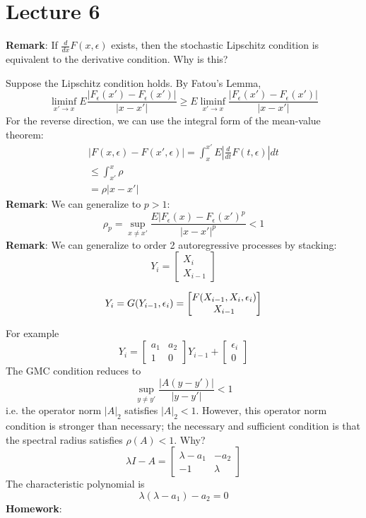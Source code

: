 \section{Lecture 6}

\textbf{Remark}: If \(\frac{d}{dx} F(x, \epsilon)\) exists, then the stochastic Lipschitz condition is equivalent to the derivative condition. Why is this?

Suppose the Lipschitz condition holds. By Fatou's Lemma,
\[\liminf_{x' \to x} E \frac{|F_\epsilon(x') - F_\epsilon(x')|}{|x - x'|} \geq E \liminf_{x' \to x} \frac{|F_\epsilon(x') - F_\epsilon(x')|}{|x - x'|}\]
For the reverse direction, we can use the integral form of the mean-value theorem:
\[\begin{gathered}|F(x, \epsilon) - F(x', \epsilon)| = \int_x^{x'} E \left| \frac{d}{dt} F(t, \epsilon) \right| dt \\
\leq \int_{x'}^x \rho \\
= \rho |x - x'|\end{gathered}\]
\textbf{Remark}: We can generalize to \(p > 1\):
\[\rho_p = \sup_{x \neq x'} \frac{E |F_\epsilon(x) - F_\epsilon(x')^p}{|x - x'|^p} < 1\]
\textbf{Remark}: We can generalize to order 2 autoregressive processes by stacking:
\[Y_i =
\begin{bmatrix}
X_i \\
X_{i-1}
\end{bmatrix}\]

\[Y_i = G(Y_{i-1}, \epsilon_i) \\
= \begin{bmatrix}
F(X_{i-1}, X_i, \epsilon_i) \\
X_{i-1}
\end{bmatrix}\]

For example
\[Y_i =
\begin{bmatrix}
a_1 & a_2 \\
1 & 0
\end{bmatrix}
Y_{i-1}
+
\begin{bmatrix}
\epsilon_i \\
0
\end{bmatrix}\]
The GMC condition reduces to
\[\sup_{y \neq y'}\frac{|A(y - y')|}{|y - y'|} < 1\]
i.e. the operator norm \(|A|_2\) satisfies \(|A|_2 < 1\). However, this operator norm condition is stronger than necessary; the necessary and sufficient condition is that the spectral radius satisfies \(\rho(A) < 1\). Why?
\[\lambda I - A =
\begin{bmatrix}
\lambda - a_1 & -a_2 \\
-1 & \lambda
\end{bmatrix}\]
The characteristic polynomial is
\[\lambda(\lambda - a_1) - a_2 = 0\]
\textbf{Homework}:

